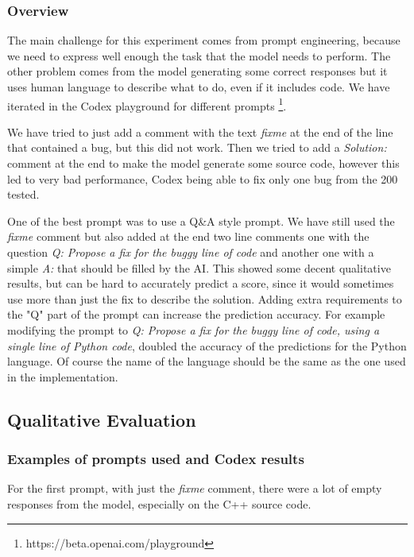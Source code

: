 \documentclass[12pt,a4paper]{report}
\begin{document}
\subsubsection{Overview}

The main challenge for this experiment comes from prompt engineering, because we need to express well enough the task that the model needs to perform. The other problem comes from the model generating some correct responses but it uses human language to describe what to do, even if it includes code. We have iterated in the Codex playground for different prompts \footnote{https://beta.openai.com/playground}. 

We have tried to just add a comment with the text \textit{fixme} at the end of the line that contained a bug, but this did not work. Then we tried to add a \textit{Solution:} comment at the end to make the model generate some source code, however this led to very bad performance, Codex being able to fix only one bug from the 200 tested. 

One of the best prompt was to use a Q\&A style prompt. We have still used the \textit{fixme} comment but also added at the end two line comments one with the question \textit{Q: Propose a fix for the buggy line of code} and another one with a simple \textit{A:} that should be filled by the AI. This showed some decent qualitative results, but can be hard to accurately predict a score, since it would sometimes use more than just the fix to describe the solution. Adding extra requirements to the "Q" part of the prompt can increase the prediction accuracy. For example modifying the prompt to \textit{Q: Propose a fix for the buggy line of code, using a single line of Python code}, doubled the accuracy of the predictions for the Python language. Of course the name of the language should be the same as the one used in the implementation.

\subsection{Qualitative Evaluation}

\subsubsection{Examples of prompts used and Codex results}

For the first prompt, with just the \textit{fixme} comment, there were a lot of empty responses from the model, especially on the C++ source code.
\end{document}
